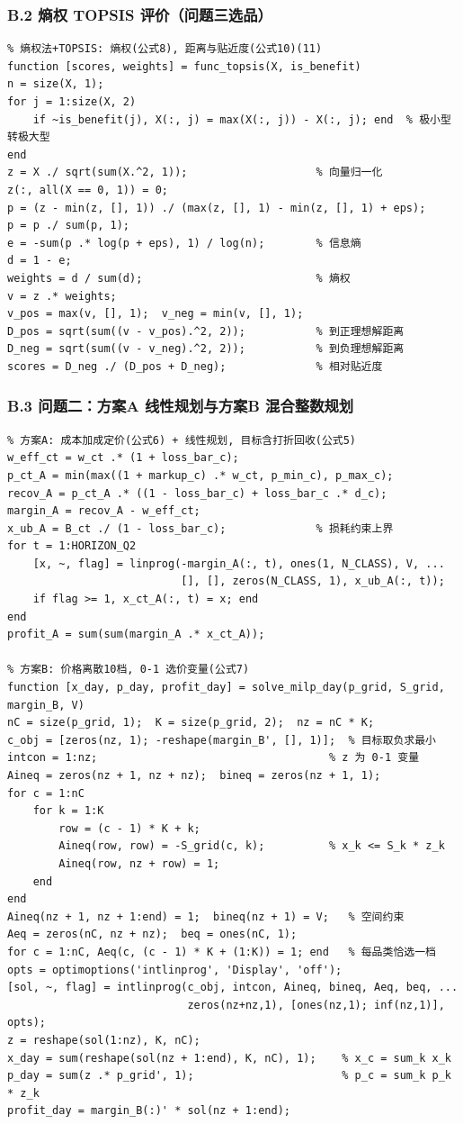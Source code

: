 \subsubsection{B.2 熵权 TOPSIS 评价（问题三选品）}

{\footnotesize
\begin{verbatim}
% 熵权法+TOPSIS: 熵权(公式8), 距离与贴近度(公式10)(11)
function [scores, weights] = func_topsis(X, is_benefit)
n = size(X, 1);
for j = 1:size(X, 2)
    if ~is_benefit(j), X(:, j) = max(X(:, j)) - X(:, j); end  % 极小型转极大型
end
z = X ./ sqrt(sum(X.^2, 1));                    % 向量归一化
z(:, all(X == 0, 1)) = 0;
p = (z - min(z, [], 1)) ./ (max(z, [], 1) - min(z, [], 1) + eps);
p = p ./ sum(p, 1);
e = -sum(p .* log(p + eps), 1) / log(n);        % 信息熵
d = 1 - e;
weights = d / sum(d);                           % 熵权
v = z .* weights;
v_pos = max(v, [], 1);  v_neg = min(v, [], 1);
D_pos = sqrt(sum((v - v_pos).^2, 2));           % 到正理想解距离
D_neg = sqrt(sum((v - v_neg).^2, 2));           % 到负理想解距离
scores = D_neg ./ (D_pos + D_neg);              % 相对贴近度
\end{verbatim}
}

\subsubsection{B.3 问题二：方案A 线性规划与方案B 混合整数规划}

{\footnotesize
\begin{verbatim}
% 方案A: 成本加成定价(公式6) + 线性规划, 目标含打折回收(公式5)
w_eff_ct = w_ct .* (1 + loss_bar_c);
p_ct_A = min(max((1 + markup_c) .* w_ct, p_min_c), p_max_c);
recov_A = p_ct_A .* ((1 - loss_bar_c) + loss_bar_c .* d_c);
margin_A = recov_A - w_eff_ct;
x_ub_A = B_ct ./ (1 - loss_bar_c);              % 损耗约束上界
for t = 1:HORIZON_Q2
    [x, ~, flag] = linprog(-margin_A(:, t), ones(1, N_CLASS), V, ...
                           [], [], zeros(N_CLASS, 1), x_ub_A(:, t));
    if flag >= 1, x_ct_A(:, t) = x; end
end
profit_A = sum(sum(margin_A .* x_ct_A));

% 方案B: 价格离散10档, 0-1 选价变量(公式7)
function [x_day, p_day, profit_day] = solve_milp_day(p_grid, S_grid, margin_B, V)
nC = size(p_grid, 1);  K = size(p_grid, 2);  nz = nC * K;
c_obj = [zeros(nz, 1); -reshape(margin_B', [], 1)];  % 目标取负求最小
intcon = 1:nz;                                    % z 为 0-1 变量
Aineq = zeros(nz + 1, nz + nz);  bineq = zeros(nz + 1, 1);
for c = 1:nC
    for k = 1:K
        row = (c - 1) * K + k;
        Aineq(row, row) = -S_grid(c, k);          % x_k <= S_k * z_k
        Aineq(row, nz + row) = 1;
    end
end
Aineq(nz + 1, nz + 1:end) = 1;  bineq(nz + 1) = V;   % 空间约束
Aeq = zeros(nC, nz + nz);  beq = ones(nC, 1);
for c = 1:nC, Aeq(c, (c - 1) * K + (1:K)) = 1; end   % 每品类恰选一档
opts = optimoptions('intlinprog', 'Display', 'off');
[sol, ~, flag] = intlinprog(c_obj, intcon, Aineq, bineq, Aeq, beq, ...
                            zeros(nz+nz,1), [ones(nz,1); inf(nz,1)], opts);
z = reshape(sol(1:nz), K, nC);
x_day = sum(reshape(sol(nz + 1:end), K, nC), 1);    % x_c = sum_k x_k
p_day = sum(z .* p_grid', 1);                       % p_c = sum_k p_k * z_k
profit_day = margin_B(:)' * sol(nz + 1:end);
\end{verbatim}
}

